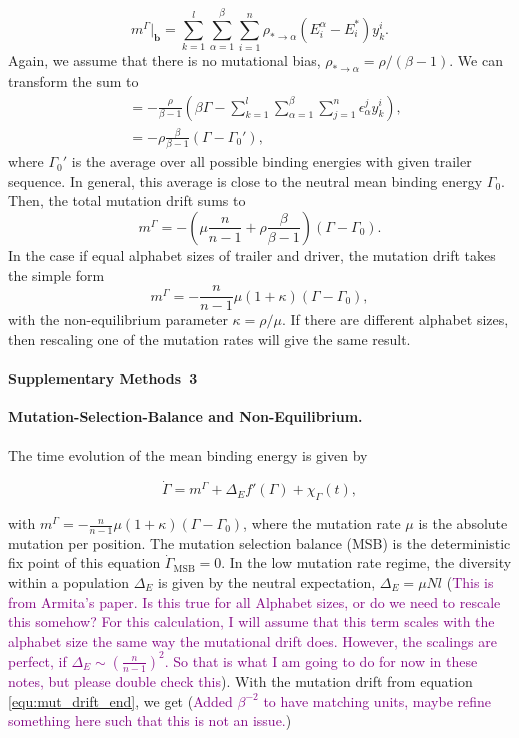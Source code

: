 \documentclass[10pt,a4paper]{article}
\newcommand{\purple}[1]{\textcolor{purple}{#1}}
\begin{document}
\begin{equation}
m^\Gamma|_\mathbf{b}=\sum_{k=1}^{l}\sum_{\alpha=1}^{\beta}\sum_{i=1}^{n}\rho_{*\rightarrow\alpha}(E^\alpha_i-E^*_i)y_k^i.
\end{equation}
Again, we assume that there is no mutational bias, $\rho_{*\rightarrow\alpha}=\rho/(\beta-1)$. We can transform the sum to
\begin{align}
	&=-\frac{\rho}{\beta-1}(\beta\Gamma-\sum_{k=1}^{l}\sum_{\alpha=1}^{\beta}\sum_{j=1}^{n}\epsilon_\alpha^jy_k^i),\nonumber\\
	&=-\rho\frac{\beta}{\beta-1}(\Gamma-\Gamma_0'),
\end{align}
where $\Gamma_0'$ is the average over all possible binding energies with given trailer sequence. In general, this average is close to the neutral mean binding energy $\Gamma_0$. Then, the total mutation drift sums to
\begin{equation}
	m^\Gamma=-\left(\mu\frac{n}{n-1}+\rho\frac{\beta}{\beta-1}\right)\left(\Gamma-\Gamma_0\right).
\end{equation}
In the case if equal alphabet sizes of trailer and driver, the mutation drift takes the simple form
	\begin{equation}
	m^\Gamma=-\frac{n}{n-1}\mu\left(1+\kappa\right)\left(\Gamma-\Gamma_0\right)\label{equ:mut_drift_end},
	\end{equation}
	with the non-equilibrium parameter $\kappa=\rho/\mu$. If there are different alphabet sizes, then rescaling one of the mutation rates will give the same result.




\clearpage
\paragraph*{Supplementary Methods~3}
\label{supp3}
{\bf{Mutation-Selection-Balance and Non-Equilibrium.}}\\ \\
The time evolution of the mean binding energy is given by \cite{held2019}

\begin{equation}
	\dot{\Gamma}=m^\Gamma+\Delta_E f'(\Gamma)+\chi_\Gamma(t),
\end{equation}

\noindent with $m^\Gamma = -\frac{n}{n-1}\mu(1+\kappa) (\Gamma - \Gamma_0)$, where the mutation rate $\mu$ is the absolute mutation per position.
The mutation selection balance (MSB) is the deterministic fix point of this equation $\dot{\Gamma}_{\mathrm{MSB}}=0$. In the low mutation rate regime, 
the diversity within a population $\Delta_E$ is given by the neutral expectation, $\Delta_E=\mu N l$ (\purple{This is from Armita's paper. Is this true 
for all Alphabet sizes, or do we need to rescale this somehow? For this calculation, I will assume that this term scales with the alphabet size the same 
way the mutational drift does. However, the scalings are perfect, if $\Delta_E\sim\left(\frac{n}{n-1}\right)^2$. So that is what I am going to do for now 
in these notes, but please double check this}). With the mutation drift from equation \ref{equ:mut_drift_end}, we get (\purple{Added $\beta^{-2}$ to have matching units, maybe refine something here such that this is not an issue.})
\end{document}
